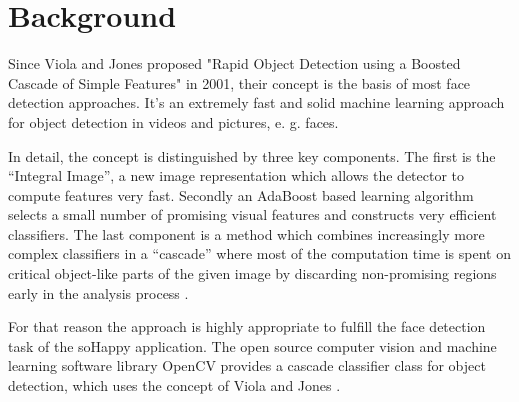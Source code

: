 \section{Background} \label{sec:background}
Since Viola and Jones proposed "Rapid Object Detection using a Boosted Cascade of Simple Features" in 2001, their concept is the basis of most face detection approaches.
It's an extremely fast and solid machine learning approach for object detection in videos and pictures, e. g. faces.

In detail, the concept is distinguished by three key components.
The first is the “Integral Image”, a new image representation which allows the detector to compute features very fast.
Secondly an AdaBoost based learning algorithm selects a small number of promising visual features and constructs very efficient classifiers.
The last component is a method which combines increasingly more complex classifiers in a “cascade” where most of the computation time is spent on critical object-like parts of the given image by discarding non-promising regions early in the analysis process \cite{viola_jones}.

For that reason the approach is highly appropriate to fulfill the face detection task of the soHappy application.
The open source computer vision and machine learning software library OpenCV provides a cascade classifier class for object detection, which uses the concept of Viola and Jones \cite{opencv_cascade_classifier}.


